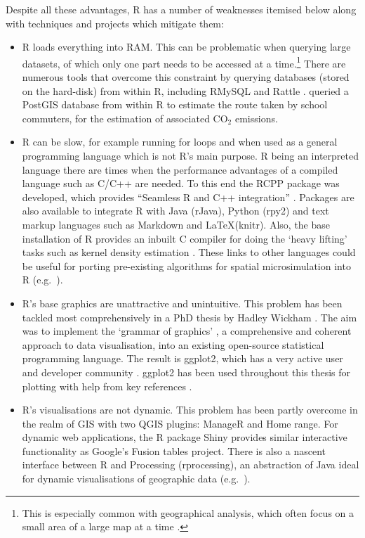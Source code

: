 \documentclass[a4paper, 11pt, twoside]{Thesis}
\begin{document}
Despite all these advantages, R has a number of weaknesses itemised below along with techniques and projects which mitigate them:
\begin{itemize}
 \item R loads everything into RAM. This can be problematic when querying
 large datasets, of which only one part needs to be accessed at a
 time.\footnote{ This is especially common with geographical analysis, which often focus
 on a small area of a large map at a time \citep{Obe2011}.
 }
 There are numerous tools
 that overcome this constraint by querying databases (stored on the hard-disk) from within R, including
 RMySQL \citep{james2012rmysql} and Rattle \citep{Williams2009}. \citet{Singleton2013-school}
 queried a PostGIS database from within R to estimate the route taken by school
 commuters, for the estimation of associated CO$_2$ emissions.
 \item R can be slow, for example running for loops and when used as a general programming
 language which is not R’s main purpose. R being an
 interpreted language there are times when the performance advantages of a compiled language such as 
 C/C++ are needed.
 To this end the RCPP package was developed, which provides
 ``Seamless R and C++ integration''  \citep{eddelbuettel2011rcpp}. Packages are also available
 to integrate R with Java (rJava), Python (rpy2) and text markup languages such as Markdown and
 \LaTeX (knitr). Also, the base installation of R provides an inbuilt C compiler for doing the
 `heavy lifting' tasks such as kernel density estimation \citep{peng2002introduction}.
 These links to other languages could be useful for porting pre-existing algorithms
 for spatial microsimulation into R (e.g.~\citealp{Williamson2007, Ballas2007simb}).
 \item R's base graphics are unattractive and unintuitive. This problem has been
 tackled most comprehensively in a PhD thesis by Hadley Wickham \citep{Wickham2008}.
 The aim was to implement the `grammar of graphics' \citep{wilkinson2005grammar},
 a comprehensive and coherent approach to data visualisation, into an existing
 open-source statistical programming language. The result is ggplot2,
 which has a very active user and developer community \citep{wickham2011ggplot2}.
 ggplot2 has been used throughout this thesis for plotting with help from key
 references \citep{wickham2011ggplot2, chang2012r}.
 \item R's visualisations are not dynamic. This problem has been partly
 overcome in the realm  of GIS with two QGIS plugins: ManageR and Home range.
 For dynamic web applications, the R package Shiny provides similar interactive
 functionality as Google's Fusion tables project. There is also a nascent
 interface between R and Processing (rprocessing), an abstraction of Java
 ideal for dynamic
 visualisations of geographic data (e.g.~\citealp{wood2010visualisation}).
\end{itemize}
\end{document}
